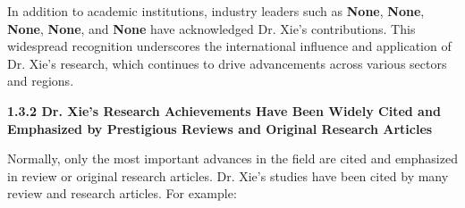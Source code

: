 \documentclass{article}
\begin{document}
In addition to academic institutions, industry leaders such as \textbf{None}, \textbf{None}, \textbf{None}, \textbf{None}, and \textbf{None} have acknowledged Dr. Xie's contributions. This widespread recognition underscores the international influence and application of Dr. Xie's research, which continues to drive advancements across various sectors and regions.








{\bf 1.3.2 Dr. Xie's Research Achievements Have Been Widely Cited and Emphasized by Prestigious Reviews and Original Research Articles}

Normally, only the most important advances in the field are cited and emphasized in review or original research articles. Dr. Xie's studies have been cited by many review and research articles. For example:
\end{document}
